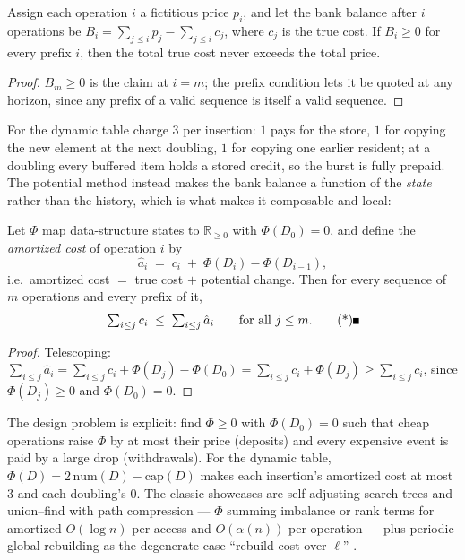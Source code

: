 \begin{theorem}\label{thm:amo-accounting}
Assign each operation $i$ a fictitious price $p_i$, and let the bank balance
after $i$ operations be $B_i = \sum_{j \le i} p_j - \sum_{j \le i} c_j$, where
$c_j$ is the true cost. If $B_i \ge 0$ for every prefix $i$, then the total
true cost never exceeds the total price. \eop
\end{theorem}

\begin{proof}
$B_m \ge 0$ is the claim at $i = m$; the prefix condition lets it be quoted at
any horizon, since any prefix of a valid sequence is itself a valid sequence.
\end{proof}

For the dynamic table charge $3$ per insertion: $1$ pays for the store, $1$
for copying the new element at the next doubling, $1$ for copying one
earlier resident; at a doubling every buffered item holds a stored credit,
so the burst is fully prepaid. The potential method instead makes the bank
balance a function of the \emph{state} rather than the history, which is
what makes it composable and local:

\begin{theorem}\label{thm:amo-potential}
Let $\Phi$ map data-structure states to $\mathbb{R}_{\ge 0}$ with
$\Phi(D_0) = 0$, and define the \emph{amortized cost} of operation $i$ by
\[
\hat{a}_i \;=\; c_i \;+\; \Phi(D_i) - \Phi(D_{i-1}),
\]
i.e.\ amortized cost $=$ true cost $+$ potential change. Then for every
sequence of $m$ operations and every prefix of it,
\[
\textstyle\sum_{i \le j} c_i \;\le\; \sum_{i \le j} \hat{a}_i
\qquad\text{for all } j \le m. \eopm
\]
\end{theorem}

\begin{proof}
Telescoping: $\sum_{i \le j} \hat{a}_i = \sum_{i \le j} c_i + \Phi(D_j) -
\Phi(D_0) = \sum_{i \le j} c_i + \Phi(D_j) \ge \sum_{i \le j} c_i$, since
$\Phi(D_j) \ge 0$ and $\Phi(D_0) = 0$.
\end{proof}

The design problem is explicit: find $\Phi \ge 0$ with $\Phi(D_0) = 0$ such
that cheap operations raise $\Phi$ by at most their price (deposits) and
every expensive event is paid by a large drop (withdrawals). For the
dynamic table, $\Phi(D) = 2\,\mathrm{num}(D) - \mathrm{cap}(D)$ makes each
insertion's amortized cost at most $3$ and each doubling's $0$. The classic
showcases are self-adjusting search trees and union--find with path
compression --- $\Phi$ summing imbalance or rank terms for amortized
$O(\log n)$ per access and $O(\alpha(n))$ per operation --- plus periodic
global rebuilding as the degenerate case ``rebuild cost over $\ell$''
\citep{amortized-potential-bg2,amortized-potential-bg1,amortized-potential-bg5}.

